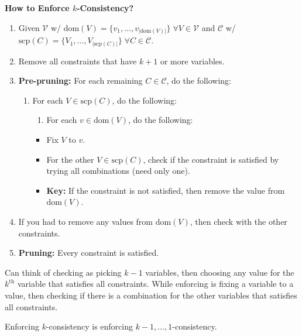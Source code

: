 \begin{process} \textbf{How to Enforce $k$-Consistency?} 
    \begin{enumerate}
        \item Given $\mathcal{V}$ w/ $\text{dom}(V) = \{v_1,\ldots,v_{|\text{dom}(V)|}\} \; \forall V \in \mathcal{V}$ and $\mathcal{C}$ w/ $\text{scp}(C) = \{V_1,\ldots,V_{|\text{scp}(C)|}\} \; \forall C \in \mathcal{C}$.
        \item Remove all constraints that have $k+1$ or more variables.
        \item \textbf{Pre-pruning:} For each remaining $C \in \mathcal{C}$, do the following:
        \begin{enumerate}
            \item For each $V \in \text{scp}(C)$, do the following:
            \begin{enumerate}
                \item For each $v \in \text{dom}(V)$, do the following:
            \end{enumerate}
            \begin{itemize}
                \item Fix $V$ to $v$.
                \item For the other $V \in \text{scp}(C)$, check if the constraint is satisfied by trying all combinations (need only one). 
                \item \textbf{Key:} If the constraint is not satisfied, then remove the value from $\text{dom}(V)$.
            \end{itemize}
        \end{enumerate}
        \item If you had to remove any values from $\text{dom}(V)$, then check with the other constraints.
        \item \textbf{Pruning:} Every constraint is satisfied.
    \end{enumerate}
\end{process}

\begin{warning}
    Can think of checking as picking $k-1$ variables, then choosing any value for the $k^\text{th}$ variable that satisfies all constraints. While enforcing is fixing a variable to a value, then checking if there is a combination for the other variables that satisfies all constraints.
\end{warning}

\begin{warning}
    Enforcing $k$-consistency is enforcing $k-1,\ldots,1$-consistency.
\end{warning}
\newpage

